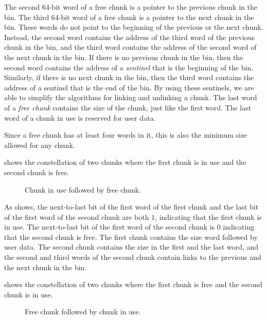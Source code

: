 The second 64-bit word of a free chunk is a pointer to the previous
chunk in the bin.  The third 64-bit word of a free chunk is a pointer
to the next chunk in the bin.  These words do not point to the
beginning of the previous or the next chunk.  Instead, the second word
contains the address of the third word of the previous chunk in the
bin, and the third word contains the address of the second word of the
next chunk in the bin.  If there is no previous chunk in the bin, then
the second word contains the address of a \emph{sentinel} that is the
beginning of the bin.  Similarly, if there is no next chunk in the
bin, then the third word contains the address of a sentinel that is
the end of the bin.  By using these sentinels, we are able to simplify
the algorithms for linking and unlinking a chunk.  The last word of a
\emph{free chunk} contains the size of the chunk, just like the first
word.  The last word of a chunk in use is reserved for user data.

Since a free chunk has at least four words in it, this is also the
minimum size allowed for any chunk.

 shows the constellation of two chunks where the
first chunk is in use and the second chunk is free.

\begin{figure}
\begin{center}
\end{center}
\caption{\label{fig-chunks2}
Chunk in use followed by free chunk.}
\end{figure}

As  shows, the next-to-last bit of the first word
of the first chunk and the last bit of the first word of the second
chunk are both $1$, indicating that the first chunk is in use.  The
next-to-last bit of the first word of the second chunk is $0$
indicating that the second chunk is free.  The first chunk contains
the size word followed by user data.  The second chunk contains the
size in the first and the last word, and the second and third words of
the second chunk contain links to the previous and the next chunk in
the bin.

 shows the constellation of two chunks where the
first chunk is free and the second chunk is in use.

\begin{figure}
\begin{center}
\end{center}
\caption{\label{fig-chunks3}
Free chunk followed by chunk in use.}
\end{figure}

